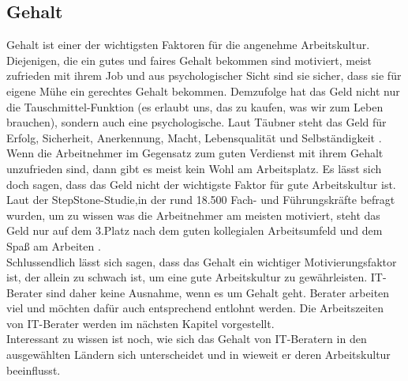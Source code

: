 \subsection*{Gehalt}
Gehalt ist einer der wichtigsten Faktoren für die angenehme Arbeitskultur. Diejenigen, die ein gutes und faires Gehalt bekommen sind motiviert, meist zufrieden mit ihrem Job und aus psychologischer Sicht sind sie sicher, dass sie für eigene Mühe ein gerechtes Gehalt bekommen. Demzufolge hat das Geld nicht nur die Tauschmittel-Funktion (es erlaubt uns, das zu kaufen, was wir zum Leben brauchen), sondern auch eine psychologische. Laut Täubner steht das Geld für Erfolg, Sicherheit, Anerkennung, Macht, Lebensqualität und Selbständigkeit \cite{GehaltBedeutungDE}.\\
Wenn die Arbeitnehmer im Gegensatz zum guten Verdienst mit ihrem Gehalt unzufrieden sind, dann gibt es meist kein Wohl am Arbeitsplatz. Es lässt sich doch sagen, dass das Geld nicht der wichtigste Faktor für gute Arbeitskultur ist. Laut der StepStone-Studie,in der rund 18.500 Fach- und Führungskräfte befragt wurden, um zu wissen was die Arbeitnehmer am meisten motiviert, steht das Geld nur auf dem 3.Platz nach dem guten kollegialen Arbeitsumfeld und dem Spaß am Arbeiten \cite{GehaltNR.3DE}.\\
 Schlussendlich lässt sich sagen, dass das Gehalt ein wichtiger Motivierungsfaktor ist, der allein zu schwach ist, um eine gute Arbeitskultur zu gewährleisten.
IT-Berater sind daher keine Ausnahme, wenn es um Gehalt geht. Berater arbeiten viel und möchten dafür auch entsprechend entlohnt werden. Die Arbeitszeiten von IT-Berater werden im nächsten Kapitel vorgestellt.\\
Interessant zu wissen ist noch, wie sich das Gehalt von IT-Beratern in den ausgewählten Ländern sich unterscheidet und in wieweit er deren Arbeitskultur beeinflusst.

